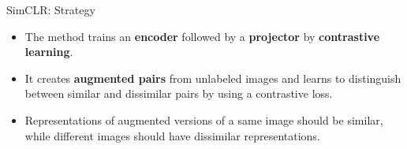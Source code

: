 \documentclass{beamer}
\begin{document}
\begin{frame}{SimCLR: Strategy}
  
\begin{itemize}
\item The method trains an \textbf{encoder} followed by a \textbf{projector}
by \textbf{contrastive learning}. 
\vspace{0.5cm}
\item It creates \textbf{augmented pairs} from unlabeled images and
  learns to distinguish between similar and dissimilar pairs by using
  a contrastive loss.
\vspace{0.5cm}
\item Representations of augmented versions of a same image should be
  \alert{similar}, while different images should have
  \alert{dissimilar} representations.
\end{itemize}
\end{frame}
\end{document}
